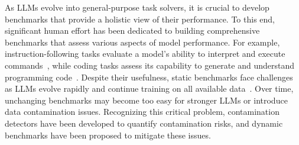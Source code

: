 As LLMs evolve into general-purpose task solvers, it is crucial to develop benchmarks that provide a holistic view of their performance.
To this end, significant human effort has been dedicated to building comprehensive benchmarks that assess various aspects of model performance. For example, instruction-following tasks evaluate a model's ability to interpret and execute commands~\citep{zhou2023instruction,qin2024infobench,huang2024c}, while coding tasks assess its capability to generate and understand programming code~\citep{chen2021evaluating,austin2021program,jimenez2024swebench,codeforces,aider}.
Despite their usefulness, static benchmarks face challenges as LLMs evolve rapidly and continue training on all available data~\citep{villalobos2022will}. Over time, unchanging benchmarks may become too easy for stronger LLMs or introduce data contamination issues.
Recognizing this critical problem, contamination detectors have been developed to quantify contamination risks, and dynamic benchmarks have been proposed to mitigate these issues.





